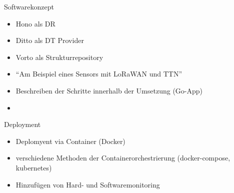 \large{Softwarekonzept}
\normalsize
\begin{itemize}
    \item Hono als DR
    \item Ditto als DT Provider
    \item Vorto als Strukturrepository
    \item \enquote{Am Beispiel eines Sensors mit LoRaWAN und TTN}
    \item Beschreiben der Schritte innerhalb der Umsetzung (Go-App)
    \item 
\end{itemize}

\large{Deployment}
\normalsize
\begin{itemize}
    \item Deplomyent via Container (Docker)
    \item verschiedene Methoden der Containerorchestrierung (docker-compose, kubernetes)
    \item Hinzufügen von Hard- und Softwaremonitoring
\end{itemize}
